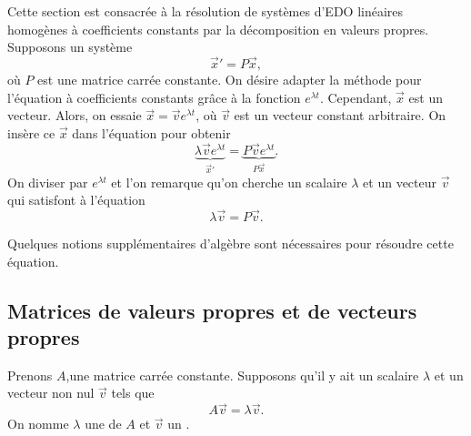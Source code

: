 Cette section est consacrée à la résolution de systèmes d’EDO linéaires homogènes à coefficients constants par la décomposition en valeurs propres. Supposons un système
\begin{equation*}
	{\vec{x}}' = P\vec{x} ,
\end{equation*}
où
$P$ est une matrice carrée constante. 
On désire adapter la méthode pour l'équation à coefficients constants grâce à la fonction $e^{\lambda t}$.
Cependant, $\vec{x}$ est un vecteur. Alors, on essaie $\vec{x} = \vec{v} e^{\lambda t}$, où
$\vec{v}$ est un vecteur constant arbitraire. On insère ce $\vec{x}$ dans l’équation pour obtenir
\begin{equation*}
	\underbrace{\lambda \vec{v} e^{\lambda t}}_{{\vec{x}}'} =
	\underbrace{P\vec{v} e^{\lambda t}}_{P\vec{x}} .
\end{equation*}
On diviser par $e^{\lambda t}$ et l'on remarque qu’on cherche un scalaire $\lambda$
et un vecteur $\vec{v}$ qui satisfont à l’équation
\begin{equation*}
	\lambda \vec{v} = P\vec{v} .
\end{equation*}

Quelques notions supplémentaires d’algèbre sont nécessaires pour résoudre cette équation.

\subsection{Matrices de valeurs propres et de vecteurs propres}

Prenons $A$,une matrice carrée constante. Supposons qu'il y ait un scalaire $\lambda$ et un vecteur non nul $\vec{v}$ tels que
\begin{equation*}
	A \vec{v} = \lambda \vec{v}.
\end{equation*}
On nomme $\lambda$ une \emph{} de $A$ et $\vec{v}$
un \emph{}.

